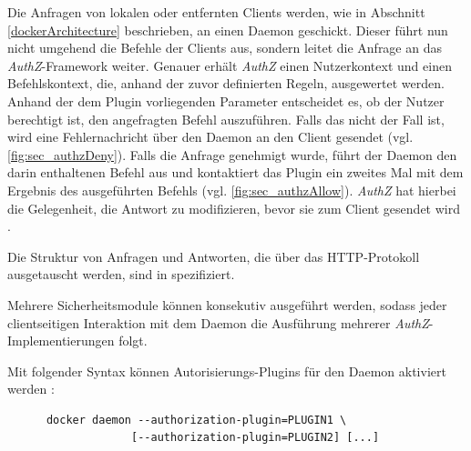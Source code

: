 \documentclass[../main.tex]{subfiles}
\begin{document}
    Die Anfragen von lokalen oder entfernten Clients werden, wie in Abschnitt \ref{dockerArchitecture} beschrieben, an einen Daemon geschickt. Dieser führt nun nicht umgehend die Befehle der Clients aus, sondern leitet die Anfrage an das \emph{AuthZ}-Framework weiter. Genauer erhält \emph{AuthZ} einen Nutzerkontext und einen Befehlskontext, die, anhand der zuvor definierten Regeln, ausgewertet werden. Anhand der dem Plugin vorliegenden Parameter entscheidet es, ob der Nutzer berechtigt ist, den angefragten Befehl auszuführen. Falls das nicht der Fall ist, wird eine Fehlernachricht über den Daemon an den Client gesendet (vgl. \fig \ref{fig:sec_authzDeny}). Falls die Anfrage genehmigt wurde, führt der Daemon den darin enthaltenen Befehl aus und kontaktiert das Plugin ein zweites Mal mit dem Ergebnis des ausgeführten Befehls (vgl. \fig \ref{fig:sec_authzAllow}). \emph{AuthZ} hat hierbei die Gelegenheit, die Antwort zu modifizieren, bevor sie zum Client gesendet wird \cite{authzTwistlock}\cite{githubAuthZDraft}.






    Die Struktur von Anfragen und Antworten, die über das HTTP-Protokoll ausgetauscht werden, sind in \cite{githubAuthZExtended} spezifiziert.

    Mehrere Sicherheitsmodule können konsekutiv ausgeführt werden, sodass jeder clientseitigen Interaktion mit dem Daemon die Ausführung mehrerer \emph{AuthZ}-Implementierungen folgt.

    Mit folgender Syntax können Autorisierungs-Plugins für den Daemon aktiviert werden \cite{githubAuthZExtended}:

    \begin{lstlisting}
      docker daemon --authorization-plugin=PLUGIN1 \
                   [--authorization-plugin=PLUGIN2] [...]
    \end{lstlisting}
\end{document}
